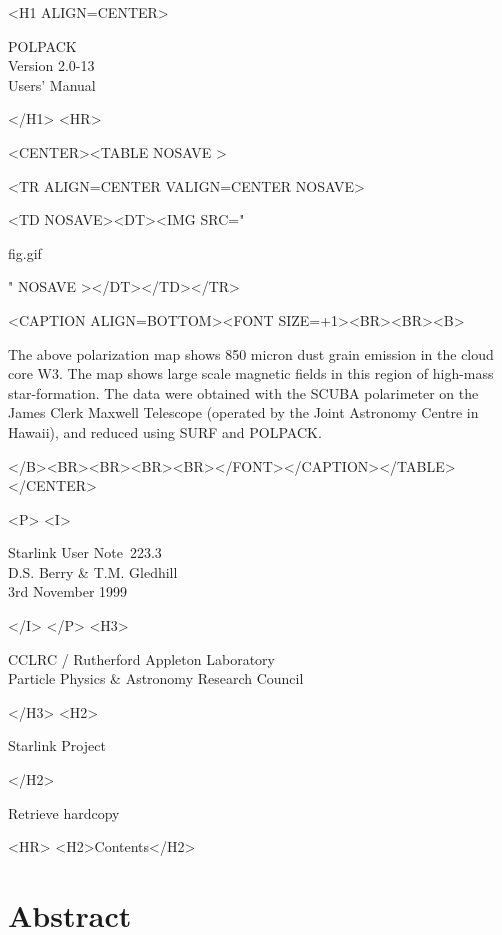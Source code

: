 \documentclass[twoside,11pt]{article}
\newcommand{\stardoccategory}  {Starlink User Note}
\newcommand{\stardocsource}    {sun\stardocnumber}
\newcommand{\stardocnumber}    {223.3}
\newcommand{\stardocauthors}   {D.S. Berry \& T.M. Gledhill }
\newcommand{\stardocdate}      {3rd November 1999}
\newcommand{\stardoctitle}     {POLPACK}
\newcommand{\stardocversion}   {Version 2.0-13}
\newcommand{\stardocmanual}    {Users' Manual}
\newcommand{\htmladdnormallink}[2]{#1}
\newcommand{\htmladdimg}[1]{}
\newcommand{\htmlref}[2]{#1}
\newcommand{\htmladdtonavigation}[1]{}
\newcommand{\xlabel}[1]{}
\renewcommand{\_}{\texttt{\symbol{95}}}
\newcommand{\htmlfig}[3]{
   \label{#1}
   \begin{rawhtml} <CENTER><TABLE NOSAVE > \end{rawhtml}
   \begin{rawhtml} <TR ALIGN=CENTER VALIGN=CENTER NOSAVE> \end{rawhtml}
   \begin{rawhtml} <TD NOSAVE><DT><IMG SRC=" \end{rawhtml}
   #2
   \begin{rawhtml} " NOSAVE ></DT></TD></TR> \end{rawhtml}
   \begin{rawhtml} <CAPTION ALIGN=BOTTOM><FONT SIZE=+1><BR><BR><B> \end{rawhtml}
   #3 
   \begin{rawhtml} </B><BR><BR><BR><BR></FONT></CAPTION></TABLE></CENTER> \end{rawhtml}
}
\begin{document}
\begin{htmlonly}
   \xlabel{}
   \begin{rawhtml} <H1 ALIGN=CENTER> \end{rawhtml}
      \stardoctitle\\
      \stardocversion\\
      \stardocmanual
   \begin{rawhtml} </H1> <HR> \end{rawhtml}

   \htmlfig{map2}{fig.gif}{The above polarization map shows 
   850 micron dust grain emission in the cloud core W3. The map shows large 
   scale magnetic fields in this region of high-mass star-formation. The 
   data were obtained with the SCUBA polarimeter on the James Clerk Maxwell 
   Telescope  (operated by the Joint Astronomy Centre in Hawaii), and 
   reduced using SURF and POLPACK.}

   \begin{rawhtml} <P> <I> \end{rawhtml}
   \stardoccategory\ \stardocnumber \\
   \stardocauthors \\
   \stardocdate
   \begin{rawhtml} </I> </P> <H3> \end{rawhtml}
      \htmladdnormallink{CCLRC}{http://www.cclrc.ac.uk} /
      \htmladdnormallink{Rutherford Appleton Laboratory}
                        {http://www.cclrc.ac.uk/ral} \\
      \htmladdnormallink{Particle Physics \& Astronomy Research Council}
                        {http://www.pparc.ac.uk} \\
   \begin{rawhtml} </H3> <H2> \end{rawhtml}
      \htmladdnormallink{Starlink Project}{http://www.starlink.rl.ac.uk/}
   \begin{rawhtml} </H2> \end{rawhtml}
   \htmladdnormallink{\htmladdimg{source.gif} Retrieve hardcopy}
      {http://www.starlink.rl.ac.uk/cgi-bin/hcserver?\stardocsource}\\

  \label{stardoccontents}
  \begin{rawhtml} 
    <HR>
    <H2>Contents</H2>
  \end{rawhtml}
  \htmladdtonavigation{\htmlref{\htmladdimg{contents_motif.gif}}
        {stardoccontents}}

  \section{\xlabel{abstract}Abstract}
\end{htmlonly}
\end{document}
